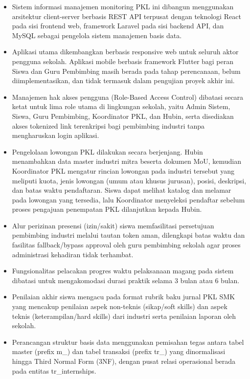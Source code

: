 \begin{itemize}
\item Sistem informasi manajemen monitoring PKL ini dibangun menggunakan arsitektur client-server berbasis REST API terpusat dengan teknologi React pada sisi frontend web, framework Laravel pada sisi backend API, dan MySQL sebagai pengelola sistem manajemen basis data.
\item Aplikasi utama dikembangkan berbasis responsive web untuk seluruh aktor pengguna sekolah. Aplikasi mobile berbasis framework Flutter bagi peran Siswa dan Guru Pembimbing masih berada pada tahap perencanaan, belum diimplementasikan, dan tidak termasuk dalam pengujian proyek akhir ini.
\item Manajemen hak akses pengguna (Role-Based Access Control) dibatasi secara ketat untuk lima role utama di lingkungan sekolah, yaitu Admin Sistem, Siswa, Guru Pembimbing, Koordinator PKL, dan Hubin, serta disediakan akses tokenized link terenkripsi bagi pembimbing industri tanpa mengharuskan login aplikasi.
\item Pengelolaan lowongan PKL dilakukan secara berjenjang. Hubin menambahkan data master industri mitra beserta dokumen MoU, kemudian Koordinator PKL mengatur rincian lowongan pada industri tersebut yang meliputi kuota, jenis lowongan (umum atau khusus jurusan), posisi, deskripsi, dan batas waktu pendaftaran. Siswa dapat melihat katalog dan melamar pada lowongan yang tersedia, lalu Koordinator menyeleksi pendaftar sebelum proses pengajuan penempatan PKL dilanjutkan kepada Hubin.
\item Alur perizinan presensi (izin/sakit) siswa memfasilitasi persetujuan pembimbing industri melalui tautan token aman, dilengkapi batas waktu dan fasilitas fallback/bypass approval oleh guru pembimbing sekolah agar proses administrasi kehadiran tidak terhambat.
\item Fungsionalitas pelacakan progres waktu pelaksanaan magang pada sistem dibatasi untuk mengakomodasi durasi praktik selama 3 bulan atau 6 bulan.
\item Penilaian akhir siswa mengacu pada format rubrik baku jurnal PKL SMK yang mencakup penilaian aspek non-teknis (sikap/soft skills) dan aspek teknis (keterampilan/hard skills) dari industri serta penilaian laporan oleh sekolah.
\item Perancangan struktur basis data menggunakan pemisahan tegas antara tabel master (prefix m\_) dan tabel transaksi (prefix tr\_) yang dinormalisasi hingga Third Normal Form (3NF), dengan pusat relasi operasional berada pada entitas tr\_internships.
\end{itemize}

